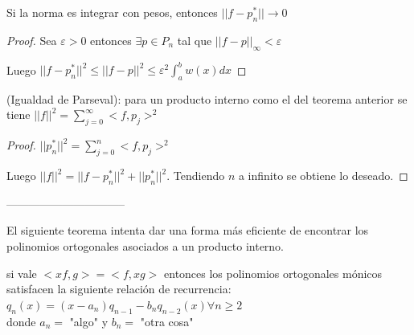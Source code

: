 \documentclass[10pt,a4paper,final]{report}
\begin{document}
\begin{theorem}Si la norma es integrar con pesos, entonces $||f-p_n^*|| \to 0$
\end{theorem}

\begin{proof}
Sea $\varepsilon > 0$ entonces $\exists p \in P_n$ tal que $||f-p||_\infty < \varepsilon$

Luego $||f-p_n^*||^2 \leq ||f-p||^2 \leq \varepsilon^2 \int_a^b w(x) dx$ \bigskip
\end{proof}

\begin{corollary}(Igualdad de Parseval): para un producto interno como el del teorema anterior se tiene $||f||^2 = \sum_{j=0}^\infty <f,p_j>^2$
\end{corollary}

\begin{proof}

$||p_n^*||^2 = \sum_{j=0}^n <f,p_j>^2$

Luego $||f||^2 = ||f-p_n^*||^2 + ||p_n^*||^2$. Tendiendo $n$ a infinito se obtiene lo deseado.
\end{proof}
--------------------------------

El siguiente teorema intenta dar una forma más eficiente de encontrar los polinomios ortogonales asociados a un producto interno.

\begin{theorem}

 si vale $<xf,g> = <f,xg>$ entonces los polinomios ortogonales mónicos satisfacen la siguiente relación de recurrencia:\\

$q_n(x) = (x-a_n) q_{n-1} - b_n q_{n-2}(x) \forall n \geq 2$ 
\\
donde $a_n=$ "algo" y $b_n=$ "otra cosa"\\
\end{theorem}
\end{document}
